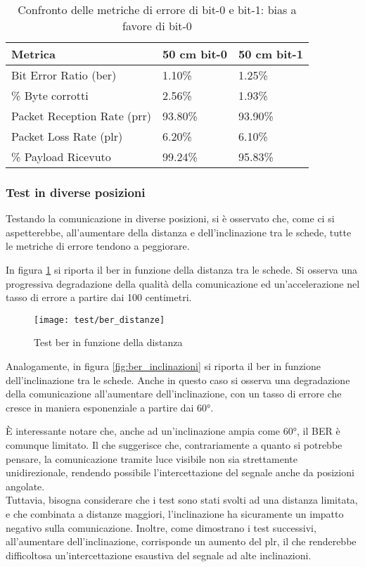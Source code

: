 \begin{table}[H]
    \caption{Confronto delle metriche di errore di bit-0 e bit-1: bias a favore di bit-0}
    \label{tab:bit-bias}
    \begin{tabularx}{\textwidth}{Xll}
        \hline
        \textbf{Metrica} & \textbf{50 cm bit-0} & \textbf{50 cm bit-1}\\
        \hline
        Bit Error Ratio (\gls{ber})            & 1.10\%  & 1.25\% \\
        \hline
        \% Byte corrotti                & 2.56\%  & 1.93\% \\
        \hline
        Packet Reception Rate (\gls{prr})     & 93.80\% & 93.90\% \\
        \hline
        Packet Loss Rate (\gls{plr})          & 6.20\%  & 6.10\% \\
        \hline
        \% Payload Ricevuto             & 99.24\% & 95.83\% \\
        \hline
    \end{tabularx}
\end{table}

\subsubsection{Test in diverse posizioni}
Testando la comunicazione in diverse posizioni, si è osservato che, come ci si aspetterebbe, all'aumentare della distanza e dell'inclinazione tra le schede, tutte le metriche di errore tendono a peggiorare.

In figura \ref{fig:ber_distanze} si riporta il \gls{ber} in funzione della distanza tra le schede. Si osserva una progressiva degradazione della qualità della comunicazione ed un'accelerazione nel tasso di errore a partire dai 100 centimetri.

\begin{figure}[H] 
    \centering 
    \texttt{[image: test/ber\_distanze]} 
    \caption{Test \gls{ber} in funzione della distanza}
    \label{fig:ber_distanze}
\end{figure}

Analogamente, in figura \ref{fig:ber_inclinazioni} si riporta il \gls{ber} in funzione dell'inclinazione tra le schede. Anche in questo caso si osserva una degradazione della comunicazione all'aumentare dell'inclinazione, con un tasso di errore che cresce in maniera esponenziale a partire dai 60°.

È interessante notare che, anche ad un'inclinazione ampia come 60°, il BER è comunque limitato. Il che suggerisce che, contrariamente a quanto si potrebbe pensare, la comunicazione tramite luce visibile non sia strettamente unidirezionale, rendendo possibile l'intercettazione del segnale anche da posizioni angolate.\\
Tuttavia, bisogna considerare che i test sono stati svolti ad una distanza limitata, e che combinata a distanze maggiori, l'inclinazione ha sicuramente un impatto negativo sulla comunicazione. Inoltre, come dimostrano i test successivi, all'aumentare dell'inclinazione, corrisponde un aumento del \gls{plr}, il che renderebbe difficoltosa un'intercettazione esaustiva del segnale ad alte inclinazioni.

